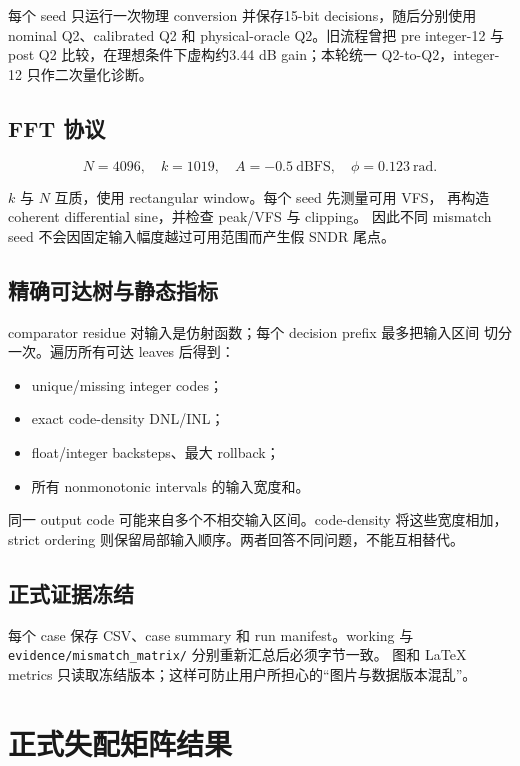 \documentclass[UTF8,11pt,a4paper]{ctexart}
\newcommand{\code}[1]{\texttt{\small #1}}
\begin{document}
每个 seed 只运行一次物理 conversion 并保存15-bit decisions，随后分别使用
nominal Q2、calibrated Q2 和 physical-oracle Q2。旧流程曾把 pre
integer-12 与 post Q2 比较，在理想条件下虚构约3.44 dB gain；本轮统一
Q2-to-Q2，integer-12 只作二次量化诊断。

\subsection{FFT 协议}

\[
  N=4096,\quad k=1019,\quad A=-0.5\ \mathrm{dBFS},\quad
  \phi=0.123\ \mathrm{rad}.
\]

$k$ 与 $N$ 互质，使用 rectangular window。每个 seed 先测量可用 VFS，
再构造 coherent differential sine，并检查 peak/VFS 与 clipping。
因此不同 mismatch seed 不会因固定输入幅度越过可用范围而产生假 SNDR 尾点。

\subsection{精确可达树与静态指标}

comparator residue 对输入是仿射函数；每个 decision prefix 最多把输入区间
切分一次。遍历所有可达 leaves 后得到：

\begin{itemize}
  \item unique/missing integer codes；
  \item exact code-density DNL/INL；
  \item float/integer backsteps、最大 rollback；
  \item 所有 nonmonotonic intervals 的输入宽度和。
\end{itemize}

同一 output code 可能来自多个不相交输入区间。code-density 将这些宽度相加，
strict ordering 则保留局部输入顺序。两者回答不同问题，不能互相替代。

\subsection{正式证据冻结}

每个 case 保存 CSV、case summary 和 run manifest。working 与
\code{evidence/mismatch\_matrix/} 分别重新汇总后必须字节一致。
图和 LaTeX metrics 只读取冻结版本；这样可防止用户所担心的“图片与数据版本混乱”。

\section[正式失配矩阵]{正式失配矩阵结果}
\end{document}
